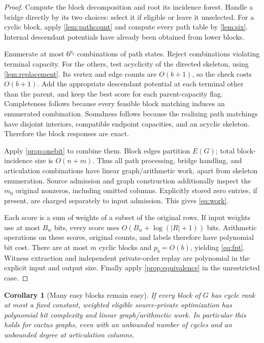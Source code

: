 \documentclass[11pt,letterpaper]{article}
\newtheorem{corollary}[corollary]{Corollary}\aliascntresetthe{corollary}
\theoremstyle{definition}
\theoremstyle{remark}
\begin{document}
\begin{proof}
Compute the block decomposition and root its incidence forest. Handle a bridge directly by its two choices: select it if eligible or leave it unselected. For a cyclic block, apply \cref{lem:pathcount} and compute every path table by \cref{lem:six}. Internal descendant potentials have already been obtained from lower blocks.

Enumerate at most $6^{p_b}$ combinations of path states. Reject combinations violating terminal capacity. For the others, test acyclicity of the directed skeleton, using \cref{lem:replacement}. Its vertex and edge counts are $O(b+1)$, so the check costs $O(b+1)$. Add the appropriate descendant potential at each terminal other than the parent, and keep the best score for each parent-capacity flag. Completeness follows because every feasible block matching induces an enumerated combination. Soundness follows because the realizing path matchings have disjoint interiors, compatible endpoint capacities, and an acyclic skeleton. Therefore the block responses are exact.

Apply \cref{prop:onebit} to combine them. Block edges partition $E(G)$; total block-incidence size is $O(n+m)$. Thus all path processing, bridge handling, and articulation combinations have linear graph/arithmetic work, apart from skeleton enumeration. Source admission and graph construction additionally inspect the $m_0$ original nonzeros, including omitted columns. Explicitly stored zero entries, if present, are charged separately to input admission. This gives \cref{eq:work}.

Each score is a sum of weights of a subset of the original rows. If input weights use at most $B_w$ bits, every score uses $O(B_w+\log(|R|+1))$ bits. Arithmetic operations on these scores, original counts, and labels therefore have polynomial bit cost. There are at most $m$ cyclic blocks and $p_b=O(b)$, yielding \cref{eq:fpt}. Witness extraction and independent private-order replay are polynomial in the explicit input and output size. Finally apply \cref{prop:equivalence} in the unrestricted case.
\end{proof}

\begin{corollary}[Many easy blocks remain easy]
\label{cor:cactus}
If every block of $G$ has cycle rank at most a fixed constant, weighted eligible source-private optimization has polynomial bit complexity and linear graph/arithmetic work. In particular this holds for cactus graphs, even with an unbounded number of cycles and an unbounded degree at articulation columns.
\end{corollary}
\end{document}
